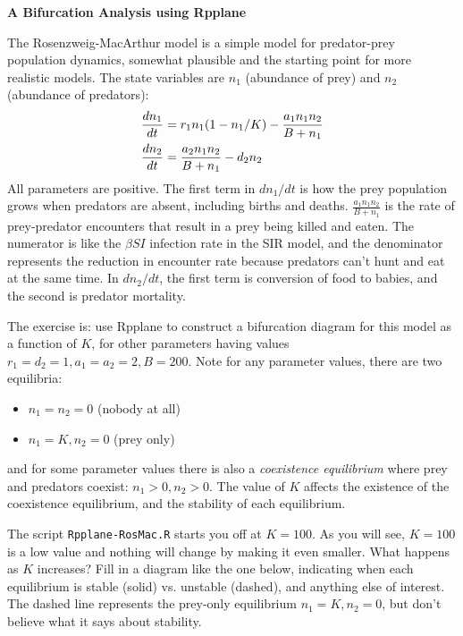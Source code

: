 \documentclass [11pt]{article}
\begin{document}
\centerline{\textbf{A Bifurcation Analysis using Rpplane}}

The Rosenzweig-MacArthur model is a simple model for
predator-prey population dynamics, somewhat plausible and the starting point for more realistic models. The state
variables are $n_1$ (abundance of prey) and $n_2$ (abundance of predators):   
\begin{equation}
\begin{gathered}
  \frac{dn_1}{dt} = r_1 n_1 (1 - n_1 /K ) - \frac{a_1 n_1 n_2}{B + n_1} \hfill \\ 
  \frac{dn_2}{dt} = \frac{a_2 n_1 n_2}{B + n_1} - d_2 n_2 \hfill  \\ 
\end{gathered}
\label{RosMacModel} 
\end{equation}
All parameters are positive. The first term in $dn_1/dt$ is how the prey population grows when predators are absent,  
including births and deaths. $\frac{a_1 n_1 n_2}{B+n_1}$ is the rate of prey-predator encounters that result 
in a prey being killed and eaten. The numerator is like the $\beta SI$ infection rate
in the SIR model, and the denominator represents 
the reduction in encounter rate because predators can't hunt and eat at the same time. 
In $dn_2/dt$, the first term is conversion of food to babies, and the second is predator mortality. 

The exercise is: use Rpplane to construct a bifurcation diagram for this model as a function of $K$, for other
parameters having values $r_1=d_2=1, a_1 = a_2 = 2, B=200$. Note for any parameter values, there are two equilibria: 
\begin{itemize}
\item $n_1 = n_2 = 0$ (nobody at all) 
\item $n_1 = K, n_2 = 0$ (prey only) 
\end{itemize} 
and for some parameter values there is also a \emph{coexistence equilibrium} 
where prey and predators coexist: $n_1 >0, n_2 >0$. The value of $K$ 
affects the existence of the coexistence equilibrium, and the stability of each equilibrium. 

The script \texttt{Rpplane-RosMac.R} starts you off at $K=100$. As you will see, $K=100$ is a low value and
nothing will change by making it even smaller. What happens as $K$ increases? Fill in a diagram like the one below, 
indicating when each equilibrium is stable (solid) vs. unstable (dashed), and anything else of interest. The dashed
line represents the prey-only equilibrium $n_1=K, n_2=0$, but don't believe what it says about stability. 
\end{document}

